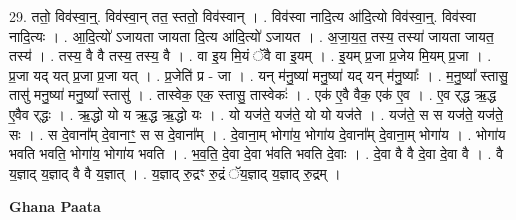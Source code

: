 \documentclass[17pt]{extarticle}
\begin{document}
29. ततो॒ विव॑स्वा॒न्॒. विव॑स्वा॒न् तत॒ स्ततो॒ विव॑स्वान् । . विव॑स्वा नादि॒त्य आ॑दि॒त्यो विव॑स्वा॒न्॒. विव॑स्वा नादि॒त्यः । . आ॒दि॒त्यो॑ ऽजायता जायता दि॒त्य आ॑दि॒त्यो॑ ऽजायत । . अ॒जा॒य॒त॒ तस्य॒ तस्या॑ जायता जायत॒ तस्य॑ । . तस्य॒ वै वै तस्य॒ तस्य॒ वै । . वा इ॒य मि॒यं ॅवै वा इ॒यम् । . इ॒यम् प्र॒जा प्र॒जेय मि॒यम् प्र॒जा । . प्र॒जा यद् यत् प्र॒जा प्र॒जा यत् । . प्र॒जेति॑ प्र - जा । . यन् म॑नु॒ष्या॑ मनु॒ष्या॑ यद् यन् म॑नु॒ष्याः᳚ । . म॒नु॒ष्या᳚ स्तासु॒ तासु॑ मनु॒ष्या॑ मनु॒ष्या᳚ स्तासु॑ । . तास्वेक॒ एक॒ स्तासु॒ तास्वेकः॑ । . एक॑ ए॒वै वैक॒ एक॑ ए॒व । . ए॒व र्‌द्ध ऋ॒द्ध ए॒वैव र्‌द्धः । . ऋ॒द्धो यो य ऋ॒द्ध ऋ॒द्धो यः । . यो यज॑ते॒ यज॑ते॒ यो यो यज॑ते । . यज॑ते॒ स स यज॑ते॒ यज॑ते॒ सः । . स दे॒वाना᳚म् दे॒वानाꣳ॒॒ स स दे॒वाना᳚म् । . दे॒वाना॒म् भोगा॑य॒ भोगा॑य दे॒वाना᳚म् दे॒वाना॒म् भोगा॑य । . भोगा॑य भवति भवति॒ भोगा॑य॒ भोगा॑य भवति । . भ॒व॒ति॒ दे॒वा दे॒वा भ॑वति भवति दे॒वाः । . दे॒वा वै वै दे॒वा दे॒वा वै । . वै य॒ज्ञाद् य॒ज्ञाद् वै वै य॒ज्ञात् । . य॒ज्ञाद् रु॒द्रꣳ रु॒द्रं ॅय॒ज्ञाद् य॒ज्ञाद् रु॒द्रम् । \newline

\textbf{Ghana Paata } \newline
\end{document}
